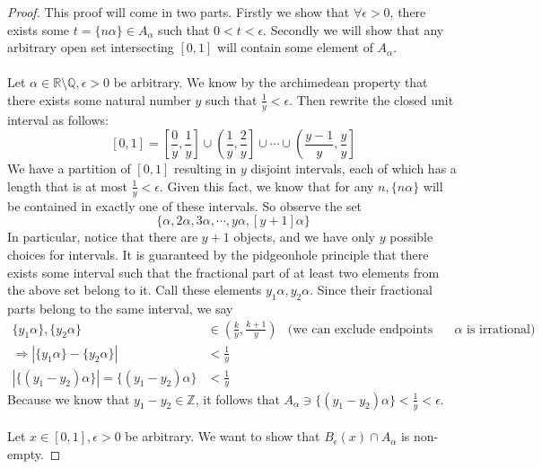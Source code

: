 \documentclass{article}
\begin{document}
        \begin{proof}
            This proof will come in two parts. Firstly we show that $\forall \epsilon > 0$, there exists some $t = \{n \alpha \} \in A_\alpha$ such that 
            $0 < t < \epsilon$. Secondly we will show that any arbitrary open set intersecting $[0,1]$ will contain some element of $A_\alpha$.\\\\
             Let $\alpha \in \mathbb{R} \setminus \mathbb{Q}, \epsilon > 0$ be arbitrary.
            We know by the archimedean property that there exists some natural number $y$ such that $\frac{1}{y} < \epsilon$.
            Then rewrite the closed unit interval as follows:
            \[
                [0,1] = \left[\frac{0}{y}, \frac{1}{y}\right] \cup \left(\frac{1}{y}, \frac{2}{y}\right] \cup \cdots \cup \left(\frac{y-1}{y}, \frac{y}{y}\right]
            \]
            We have a partition of $[0,1]$ resulting in $y$ disjoint intervals, each of which has a length that is at most $\frac{1}{y} < \epsilon$.
            Given this fact, we know that for any $n, \{n \alpha\}$ will be contained in exactly one of these intervals. So observe the set
            \[
                \{\alpha, 2 \alpha, 3 \alpha , \cdots , y \alpha, [y+1] \alpha\}
            \]
            In particular, notice that there are $y+1$ objects, and we have only $y$ possible choices for intervals. It is guaranteed by the 
            pidgeonhole principle that there exists some interval such that the fractional part of at least two elements from the above set belong to it.
            Call these elements $y_1 \alpha, y_2 \alpha$. Since their fractional parts belong to the same interval, we say
            \begin{align*}
                \{y_1 \alpha\}, \{y_2 \alpha\} &\in \left(\frac{k}{y}, \frac{k+1}{y}\right) & \text{(we can exclude endpoints since $\alpha$ is irrational)}\\
                \Rightarrow |\{y_1 \alpha\} - \{y_2 \alpha\}| &< \frac{1}{y}\\
                |\{(y_1 - y_2) \alpha \}| = \{(y_1 - y_2) \alpha \} & < \frac{1}{y}
            \end{align*}
            Because we know that $y_1 - y_2 \in \mathbb{Z}$, it follows that $A_\alpha \ni \{(y_1 - y_2) \alpha \} < \frac{1}{y} < \epsilon$. \\\\
             Let $x \in [0,1], \epsilon > 0$ be arbitrary. We want to show that $B_\epsilon(x) \cap A_\alpha$ is non-empty.

\end{proof}
\end{document}
